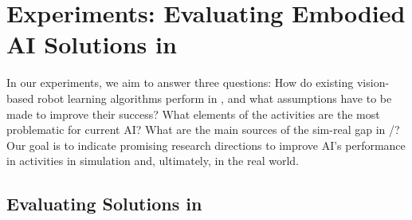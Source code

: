 \section{Experiments: Evaluating Embodied AI Solutions in \benchmark}
\label{sec:baseline}


In our experiments, we aim to answer three questions: How do existing vision-based robot learning algorithms perform in \benchmark, and what assumptions have to be made to improve their success? What elements of the activities are the most problematic for current AI? What are the main sources of the sim-real gap in \benchmark/\simulator? Our goal is to indicate promising research directions to improve AI's performance in \benchmark activities in simulation and, ultimately, in the real world.


\subsection{Evaluating \benchmark Solutions in \simulator}
\label{ss:ev_in_sim}

